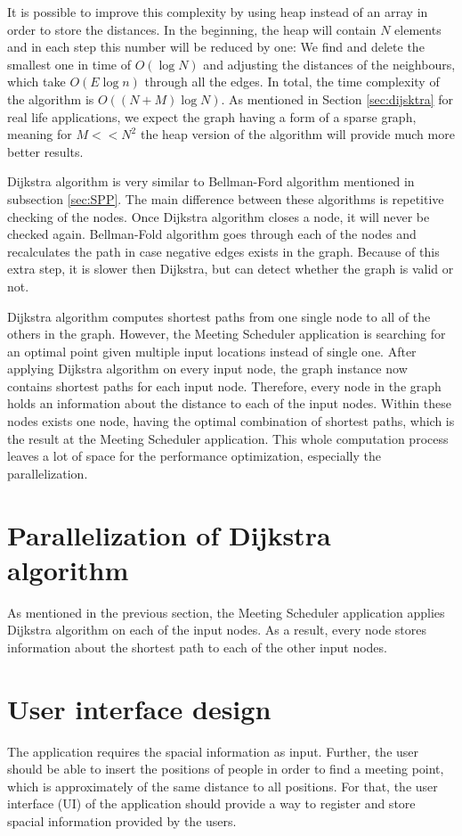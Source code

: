 \documentclass[thesis=M,english]{FITthesis}[2012/10/20]
\begin{document}
It is possible to improve this complexity by using heap instead of an array in order to store the distances. In the beginning, the heap will contain $N$ elements and in each step this number will be reduced by one: We find and delete the smallest one in time of $O(\log{N})$ and adjusting the distances of the neighbours, which take $O(E\log{n})$ through all the edges. In total, the time complexity of the algorithm is $O((N+M) \log{N})$. As mentioned in Section \ref{sec:dijsktra} for real life applications, we expect the graph having a form of a sparse graph, meaning for $M << N^2$ the heap version of the algorithm will provide much more better results.


Dijkstra algorithm is very similar to Bellman-Ford algorithm mentioned in subsection \ref{sec:SPP}. The main difference between these algorithms is repetitive checking of the nodes. Once Dijkstra algorithm closes a node, it will never be checked again. Bellman-Fold algorithm goes through each of the nodes and recalculates the path in case negative edges exists in the graph. Because of this extra step, it is slower then Dijkstra, but can detect whether the graph is valid or not.

Dijkstra algorithm computes shortest paths from one single node to all of the others in the graph. However, the Meeting Scheduler application is searching for an optimal point given multiple input locations instead of single one. After applying Dijkstra algorithm on every input node, the graph instance now contains shortest paths for each input node. Therefore, every node in the graph holds an information about the distance to each of the input nodes. Within these nodes exists one node, having the optimal combination of shortest paths, which is the result at the Meeting Scheduler application.
This whole computation process leaves a lot of space for the performance optimization, especially the parallelization. 

\section{Parallelization of Dijkstra algorithm}
As mentioned in the previous section, the Meeting Scheduler application applies Dijkstra algorithm on each of the input nodes. As a result, every node stores information about the shortest path to each of the other input nodes. 

\section{User interface design}
The application requires the spacial information as input. 
Further, the user should be able to insert the positions of people in order to find a meeting point, which is approximately of the same distance to all positions. For that, the user interface (UI) of the application should provide a way to register and store spacial information provided by the users. 
\end{document}
